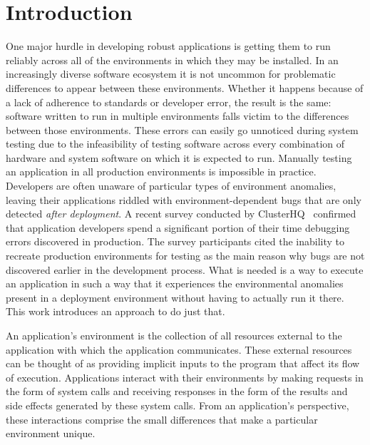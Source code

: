 \section{Introduction}

One major hurdle in developing robust applications is getting them to
run reliably across all of the environments in which they may be
installed.  In an increasingly diverse software ecosystem it is not
uncommon for problematic differences to appear between these
environments.  Whether it happens because of a lack of adherence to
standards or developer error, the result is the same: software written
to run in multiple environments falls victim to the differences
between those environments.  These errors can easily go unnoticed
during system testing due to the infeasibility of testing software
across every combination of hardware and system software on which it
is expected to run.  Manually testing an application in all production
environments is impossible in practice. Developers are often unaware
of particular types of environment anomalies, leaving their
applications riddled with environment-dependent bugs that are only
detected \emph{after deployment}. A recent survey conducted by
ClusterHQ~\cite{ClusterHQSurvey} confirmed that application developers
spend a significant portion of their time debugging errors discovered
in production.  The survey participants cited the inability to
recreate production environments for testing as the main reason why
bugs are not discovered earlier in the development process.  What is
needed is a way to execute an application in such a way that it
experiences the environmental anomalies present in a deployment
environment without having to actually run it there.  This work
introduces an approach to do just that.

An application's environment is the collection of all resources
external to the application with which the application communicates.
These external resources can be thought of as providing implicit
inputs to the program that affect its flow of execution. Applications
interact with their environments by making requests in the form of
system calls and receiving responses in the form of the results and
side effects generated by these system calls.  From an application's
perspective, these interactions comprise the small differences that
make a particular environment unique.  

